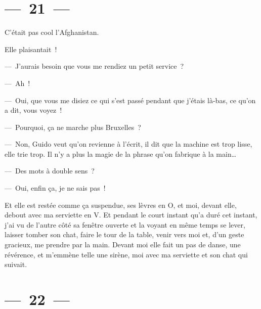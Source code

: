 \documentclass[twoside]{book} %
\begin{document}
\section[{— 21 —}]{— 21 —}
\renewcommand{\leftmark}{— 21 —}

\noindent C’était pas cool l’Afghanistan.\par
Elle plaisantait !\par
— J’aurais besoin que vous me rendiez un petit service ?\par
— Ah !\par
— Oui, que vous me disiez ce qui s’est passé pendant que j’étais là-bas, ce qu’on a dit, vous voyez !\par
— Pourquoi, ça ne marche plus Bruxelles ?\par
— Non, Guido veut qu’on revienne à l’écrit, il dit que la machine est trop lisse, elle trie trop. Il n’y a plus la magie de la phrase qu’on fabrique à la main…\par
— Des mots à double sens ?\par
— Oui, enfin ça, je ne sais pas !\par
Et elle est restée comme ça suspendue, ses lèvres en O, et moi, devant elle, debout avec ma serviette en V. Et pendant le court instant qu’a duré cet instant, j’ai vu de l’autre côté sa fenêtre ouverte et la voyant en même temps se lever, laisser tomber son chat, faire le tour de la table, venir vers moi et, d’un geste gracieux, me prendre par la main. Devant moi elle fait un pas de danse, une révérence, et m’emmène telle une sirène, moi avec ma serviette et son chat qui suivait.

\section[{— 22 —}]{— 22 —}
\renewcommand{\leftmark}{— 22 —}
\end{document}
